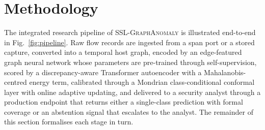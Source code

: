 \documentclass[journal,twoside]{IEEEtran}
\begin{document}
\section{Methodology}
\label{sec:method}

The integrated research pipeline of \textsc{SSL-GraphAnomaly} is
illustrated end-to-end in Fig.~\ref{fig:pipeline}. Raw flow records are
ingested from a span port or a stored capture, converted into a temporal
host graph, encoded by an edge-featured graph neural network whose
parameters are pre-trained through self-supervision, scored by a
discrepancy-aware Transformer autoencoder with a Mahalanobis-centred energy
term, calibrated through a Mondrian class-conditional conformal layer with
online adaptive updating, and delivered to a security analyst through a
production endpoint that returns either a single-class prediction with
formal coverage or an abstention signal that escalates to the analyst.
The remainder of this section formalises each stage in turn.
\end{document}
